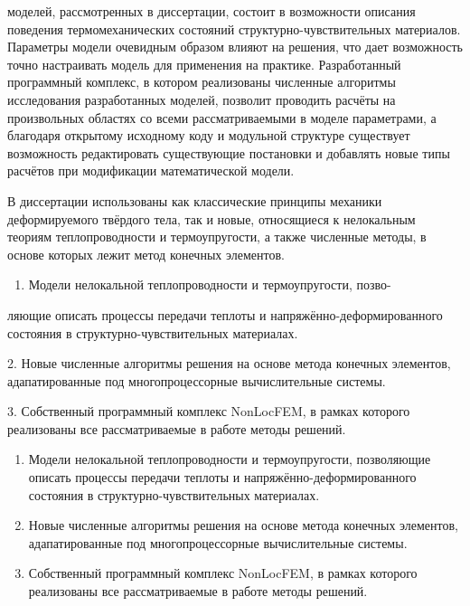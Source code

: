 {\influence}
моделей, рассмотренных в диссертации, состоит в возможности описания поведения термомеханических состояний структурно-чувствительных материалов. Параметры модели очевидным образом влияют на решения, что дает возможность точно настраивать модель для применения на практике. Разработанный программный комплекс, в котором реализованы численные алгоритмы исследования разработанных моделей, позволит проводить расчёты на произвольных областях со всеми рассматриваемыми в моделе параметрами, а благодаря открытому исходному коду и модульной структуре существует возможность редактировать существующие постановки и добавлять новые типы расчётов при модификации математической модели.

{\methods}
В диссертации использованы как классические принципы механики деформируемого твёрдого тела, так и новые, относящиеся к нелокальным теориям теплопроводности и термоупругости, а также численные методы, в основе которых лежит метод конечных элементов.

\ifsynopsis
{}
\begin{enumerate}[beginpenalty=10000] %
 	\item Модели нелокальной теплопроводности и термоупругости, позво-
\end{enumerate}
ляющие описать процессы передачи теплоты и напряжённо-деформированного состояния в структурно-чувствительных материалах.

2. Новые численные алгоритмы решения на основе метода конечных элементов, адапатированные под многопроцессорные вычислительные системы.

3. Собственный программный комплекс NonLocFEM, в рамках которого реализованы все рассматриваемые в работе методы решений.
\else
{}
\begin{enumerate}[beginpenalty=10000] %
 	\item Модели нелокальной теплопроводности и термоупругости, позволяющие описать процессы передачи теплоты и напряжённо-деформированного состояния в структурно-чувствительных материалах.
	\item Новые численные алгоритмы решения на основе метода конечных элементов, адапатированные под многопроцессорные вычислительные системы.
	\item Собственный программный комплекс NonLocFEM, в рамках которого реализованы все рассматриваемые в работе методы решений.
\end{enumerate}
\fi

